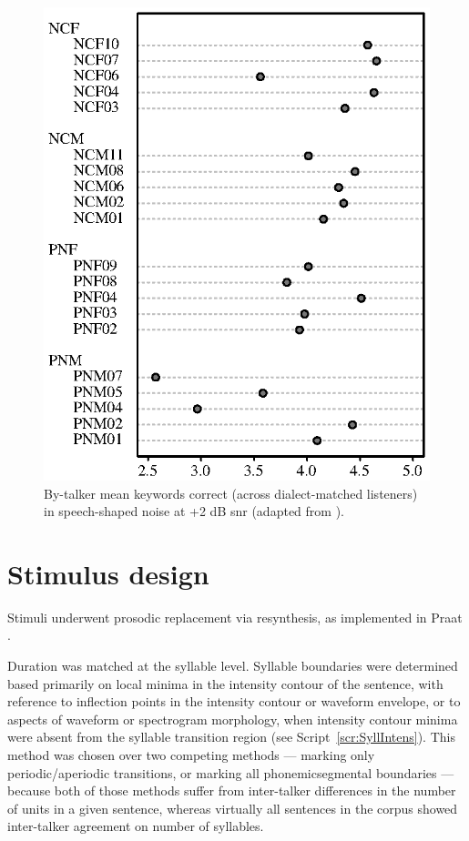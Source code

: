 \begin{figure}
	\begin{centering}
	\includegraphics{figures/dotchart.eps}
	\caption[Intelligibility of talkers used to make the stimuli]{By-talker mean keywords correct (across dialect-matched listeners) in speech-shaped noise at +2 dB \ac{snr} (adapted from \citet{McCloyEtAl2013}).\label{fig:dotchart}}
	\end{centering}
\end{figure}

\section{Stimulus design\label{sec:StimDesign}}
Stimuli underwent prosodic replacement via \psola{} resynthesis, as implemented in Praat \citep{praat}.

Duration was matched at the syllable level.  Syllable boundaries were determined based primarily on local minima in the intensity contour of the sentence, with reference to inflection points in the intensity contour or waveform envelope, or to aspects of waveform or spectrogram morphology, when intensity contour minima were absent from the syllable transition region (see Script~\ref{scr:SyllIntens}).  This method was chosen over two competing methods — marking only periodic/aperiodic transitions, or marking all phonemic\slsh{}segmental boundaries — because both of those methods suffer from inter-talker differences in the number of units in a given sentence, whereas virtually all sentences in the corpus showed inter-talker agreement on number of syllables.

